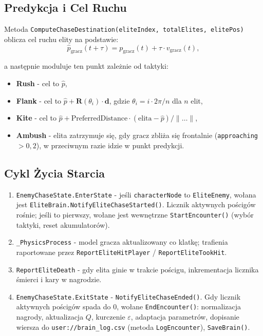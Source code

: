 
\subsection{Predykcja i Cel Ruchu}

Metoda \texttt{ComputeChaseDestination(eliteIndex, totalElites, elitePos)} oblicza cel ruchu elity na podstawie:
\[
    \hat p_\text{gracz}(t + \tau) = p_\text{gracz}(t) + \tau \cdot v_\text{gracz}(t),
\]

a następnie moduluje ten punkt zależnie od taktyki:
\begin{itemize}
    \item \textbf{Rush} - cel to $\hat p$,
    \item \textbf{Flank} - cel to $\hat p + \mathbf{R}(\theta_i) \cdot \mathbf{d}$, gdzie $\theta_i = i \cdot 2\pi/n$ dla $n$ elit,
    \item \textbf{Kite} - cel to $\hat p + \text{PreferredDistance} \cdot (\text{elita} - \hat p)/\|\dots\|$,
    \item \textbf{Ambush} - elita zatrzymuje się, gdy gracz zbliża się frontalnie (\texttt{approaching} $> 0{,}2$), w przeciwnym razie idzie w punkt predykcji.
\end{itemize}

\subsection{Cykl Życia Starcia}

\begin{enumerate}
    \item \texttt{EnemyChaseState.EnterState} - jeśli \texttt{characterNode} to \texttt{EliteEnemy}, wołana jest \texttt{EliteBrain.NotifyEliteChaseStarted()}. Licznik aktywnych pościgów rośnie; jeśli to pierwszy, wołane jest wewnętrzne \texttt{StartEncounter()} (wybór taktyki, reset akumulatorów).
    \item \texttt{\_PhysicsProcess} - model gracza aktualizowany co klatkę; trafienia raportowane przez \texttt{ReportEliteHitPlayer} / \texttt{ReportEliteTookHit}.
    \item \texttt{ReportEliteDeath} - gdy elita ginie w trakcie pościgu, inkrementacja licznika śmierci i kary w nagrodzie.
    \item \texttt{EnemyChaseState.ExitState} - \texttt{NotifyEliteChaseEnded()}. Gdy licznik aktywnych pościgów spada do 0, wołane \texttt{EndEncounter()}: normalizacja nagrody, aktualizacja $Q$, kurczenie $\varepsilon$, adaptacja parametrów, dopisanie wiersza do \texttt{user://brain\_log.csv} (metoda \texttt{LogEncounter}), \texttt{SaveBrain()}.
\end{enumerate}

